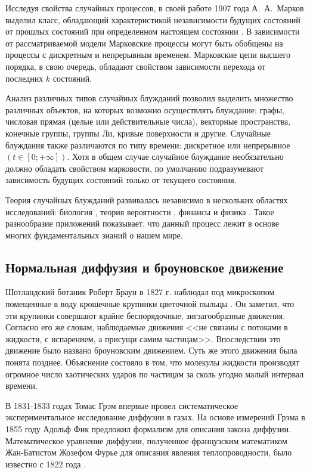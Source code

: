 Исследуя свойства случайных процессов, в своей работе 1907 года А.~А.~Марков выделил класс, обладающий характеристикой независимости будущих состояний от прошлых состояний при определенном настоящем состоянии \cite{shiryaev_2021}. В зависимости от рассматриваемой модели Марковские процессы могут быть обобщены на процессы с дискретным и непрерывным временем. Марковские цепи высшего порядка, в свою очередь, обладают свойством зависимости перехода от последних $k$ состояний.

Анализ различных типов случайных блужданий позволил выделить множество различных объектов, на которых возможно осуществлять блуждание: графы, числовая прямая (целые или действительные числа), векторные пространства, конечные группы, группы Ли, кривые поверхности и другие. Случайные блуждания также различаются по типу времени: дискретное или непрерывное $(t \in [0; +\infty])$. Хотя в общем случае случайное блуждание необязательно должно обладать свойством марковости, по умолчанию подразумевают зависимость будущих состояний только от текущего состояния.

Теория случайных блужданий развивалась независимо в нескольких областях исследований: биология \cite{chowdhury_100_2005}, теория вероятности \cite{strecker_alexandr_2011}, финансы \cite{bachelier_theorie_1900} и физика \cite{pearson_problem_1905,rayleigh_problem_1905}. Такое разнообразие приложений показывает, что данный процесс лежит в основе многих фундаментальных знаний о нашем мире.

\subsection{Нормальная диффузия и броуновское движение}\label{subsec:ch1/sec2/sub1}

Шотландский ботаник Роберт Браун в 1827 г. наблюдал под микроскопом помещенные в воду крошечные крупинки цветочной пыльцы \cite{brown_brief_2015}. Он заметил, что эти крупинки совершают крайне беспорядочные, зигзагообразные движения. Согласно его же словам, наблюдаемые движения <<не связаны с потоками в жидкости, с испарением, а присущи самим частицам>>. Впоследствии это движение было названо броуновским движением. Суть же этого движения была понята позднее. Объяснение состояло в том, что молекулы жидкости производят огромное число хаотических ударов по частицам за сколь угодно малый интервал времени.

В 1831-1833 годах Томас Грэм впервые провел систематическое экспериментальное исследование диффузии в газах. На основе измерений Грэма в 1855 году Адольф Фик предложил формализм для описания закона диффузии. Математическое уравнение диффузии, полученное французским математиком Жан-Батистом Жозефом Фурье для описания явления теплопроводности, было известно с 1822 года \cite{fourier_theorie_1822}. 

